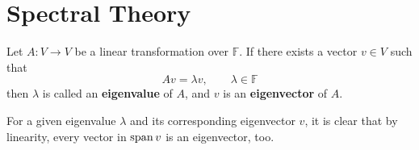 \section{Spectral Theory} 

  \begin{definition}[Eigenvalue]
    \label{def:eigenvalue}
    Let $A: V \to V$ be a linear transformation over $\mathbb{F}$. If there exists a vector $v \in V$ such that
		\begin{equation}
    	A v = \lambda v, \qquad \lambda \in \mathbb{F}
		\end{equation}
    then $\lambda$ is called an \textbf{eigenvalue} of $A$, and $v$ is an \textbf{eigenvector} of $A$. 
  \end{definition}

  For a given eigenvalue $\lambda$ and its corresponding eigenvector $v$, it is clear that by linearity, every vector in $\operatorname{span} v$ is an eigenvector, too. 
	
